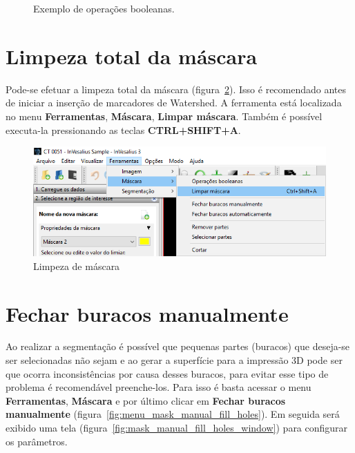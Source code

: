 \begin{figure}[!htb]
  \hfill  
  \caption{Exemplo de operações booleanas.}
  \label{fig:op_boolana}
\end{figure}

\section{Limpeza total da máscara}
\label{cap:limpeza_mascara}

Pode-se efetuar a limpeza total da máscara (figura~\ref{fig:limpeza_mascara}). Isso é recomendado antes de iniciar a inserção de marcadores de Watershed. A ferramenta está localizada no menu \textbf{Ferramentas}, \textbf{Máscara}, \textbf{Limpar máscara}. Também é possível executa-la pressionando as teclas \textbf{CTRL+SHIFT+A}.

\begin{figure}[!htb]
\centering
\includegraphics[scale=0.5]{../user_guide_figures/invesalius_screen/mask_clean_menu_pt.png}
\caption{Limpeza de máscara}
\label{fig:limpeza_mascara}
\end{figure}

\section{Fechar buracos manualmente}

Ao realizar a segmentação é possível que pequenas partes (buracos) que deseja-se ser selecionadas não sejam e ao gerar a superfície para a impressão 3D pode ser que ocorra inconsistências por causa desses buracos, para evitar esse tipo de problema é recomendável preenche-los. Para isso é basta acessar o menu \textbf{Ferramentas}, \textbf{Máscara} e por último clicar em \textbf{Fechar buracos manualmente} (figura~\ref{fig:menu_mask_manual_fill_holes}). Em seguida será exibido uma tela (figura~\ref{fig:mask_manual_fill_holes_window}) para configurar os parâmetros.

